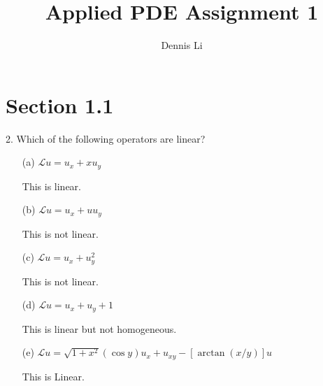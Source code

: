 \documentclass[12pt]{article}
\title{\textbf{Applied PDE Assignment 1}}
\author{Dennis Li}
\begin{document}
\maketitle
\section{Section 1.1}
2. Which of the following operators are linear?
\begin{itemize}
    \item[(a)] $\mathcal{L} u = u_x + x u_y$ 
    
    This is linear.
    \item[(b)] $\mathcal{L} u = u_x + u u_y$ 
    
    This is not linear.
    \item[(c)] $\mathcal{L} u = u_x + u_y^2$ 
    
    This is not linear.
    \item[(d)] $\mathcal{L} u = u_x + u_y + 1$ 
    
    This is linear but not homogeneous.
    \item[(e)] $\mathcal{L} u = \sqrt{1 + x^2} (\cos y) u_x + u_{xy} - [\arctan(x/y)] u$ 

    This is Linear.
\end{itemize}
\end{document}
